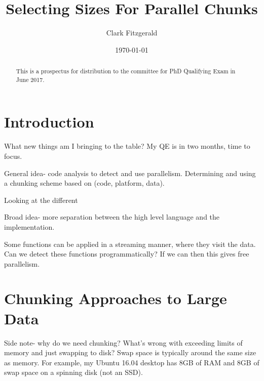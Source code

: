 \documentclass[12pt]{article}
\begin{document}
\title{Selecting Sizes For Parallel Chunks}
\date{\today}
\author{Clark Fitzgerald}
\maketitle

\begin{abstract}

    This is a prospectus for distribution to the committee for PhD
    Qualifying Exam in June 2017.

\end{abstract}


\section{Introduction}

What new things am I bringing to the table? My QE is in two months, time to
focus.

General idea- code analysis to detect and use parallelism. Determining and
using a chunking scheme based on (code, platform, data).

Looking at the different 

Broad idea- more separation between the high level language
and the implementation.

Some functions can be applied in a streaming manner, where they visit the
data. Can we detect these functions programmatically? If we can then this
gives free parallelism.


\section{Chunking Approaches to Large Data}

Side note- why do we need chunking? What's wrong with exceeding limits of
memory and just swapping to disk? Swap space is typically around the same
size as memory. For example, my Ubuntu 16.04 desktop has 8GB of RAM and 8GB
of swap space on a spinning disk (not an SSD).
\end{document}
